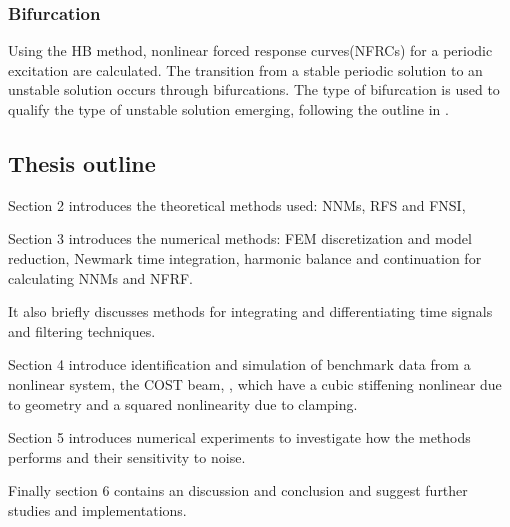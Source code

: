 \subsubsection{Bifurcation}
\label{sec:bifurcation}


Using the HB method, nonlinear forced response curves(NFRCs) for a periodic
excitation are calculated. The transition from a stable periodic solution to an
unstable solution occurs through bifurcations. The type of bifurcation is used
to qualify the type of unstable solution emerging, following the outline in
\cite{detroux2015a}.


\subsection{Thesis outline}
\label{sec:thesis-outline}

Section 2 introduces the theoretical methods used: NNMs, RFS and FNSI,

Section 3 introduces the numerical methods: FEM discretization and model
reduction, Newmark time integration, harmonic balance and continuation for
calculating NNMs and NFRF.

It also briefly discusses methods for integrating and differentiating time
signals and filtering techniques.

Section 4 introduce identification and simulation of benchmark data from a
nonlinear system, the COST beam, \cite{GOLINVAL2003}, which have a cubic
stiffening nonlinear due to geometry and a squared nonlinearity due to clamping.

Section 5 introduces numerical experiments to investigate how the methods
performs and their sensitivity to noise.

Finally section 6 contains an discussion and conclusion and suggest further
studies and implementations.




